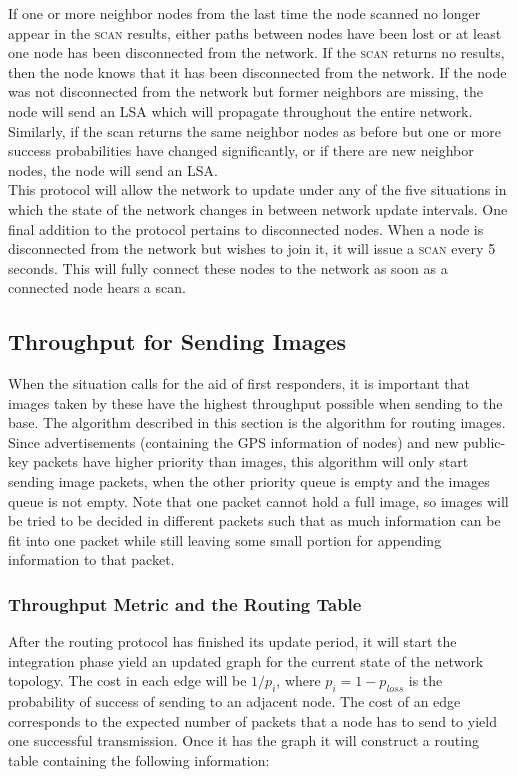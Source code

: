 \documentclass[letterpaper]{article}
\begin{document}
\noindent If one or more neighbor nodes from the last time the node scanned no longer appear in 
the \textsc{scan} results, either paths between nodes have been lost or at least one node has
been disconnected from the network. If the \textsc{scan} returns no results, then the node knows
that it has been disconnected from the network. If the node was not disconnected from the network
but former neighbors are missing, the node will send an LSA which will propagate throughout the
entire network. Similarly, if the scan returns the same neighbor nodes as before but one or more
success probabilities have changed significantly, or if there are new neighbor nodes, the node will
send an LSA.
\\

\noindent This protocol will allow the network to update under any of the five situations in which
the state of the network changes in between network update intervals. One final addition to the
protocol pertains to disconnected nodes. When a node is disconnected from the network but wishes to
join it, it will issue a \textsc{scan} every 5 seconds. This will fully connect these nodes to the
network as soon as a connected node hears a scan. 

\subsection{Throughput for Sending Images}

When the situation calls for the aid of first responders, it is important that images taken by these
have the highest throughput possible when sending to the base. The algorithm described in this section
is the algorithm for routing images. Since advertisements (containing the GPS information of nodes) and
new public-key packets have higher priority than images, this algorithm will only start sending image
packets, when the other priority queue is empty and the images queue is not empty. Note that one packet
cannot hold a full image, so images will be tried to be decided in different packets such that as much
information can be fit into one packet while still leaving some small portion for appending information
to that packet.

\subsubsection{Throughput Metric and the Routing Table}

After the routing protocol has finished its update period, it will start the integration phase yield an
updated graph for the current state of the network topology. The cost in each edge will be $1/p_{i}$, 
where $p_{i} = 1 - p_{loss}$ is the probability of success of sending to an adjacent node. The cost of an
edge corresponds to the expected number of packets that a node has to send to yield one successful
transmission. Once it has the graph it will construct a routing table containing the following information:
\end{document}
